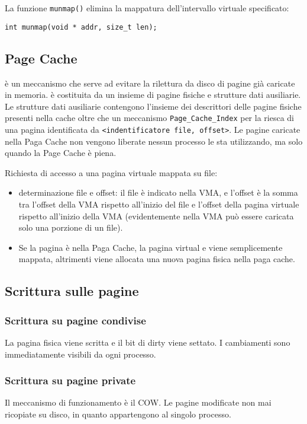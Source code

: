 \documentclass[12pt, a4paper]{report}
\begin{document}
La funzione \texttt{munmap()} elimina la mappatura dell'intervallo virtuale
specificato:
\begin{verbatim}
int munmap(void * addr, size_t len);
\end{verbatim}

\subsection{Page Cache}
è un meccanismo che serve ad evitare la rilettura da disco di pagine già
caricate in memoria. è costituita da un insieme di pagine fisiche e strutture
dati ausiliarie. Le strutture dati ausiliarie contengono l'insieme dei
descrittori delle pagine fisiche presenti nella cache oltre che un meccanismo
\texttt{Page\_Cache\_Index} per la riesca di una pagina identificata da
\texttt{<indentificatore file, offset>}. Le pagine caricate nella Paga Cache non
vengono liberate nessun processo le sta utilizzando, ma solo quando la Page
Cache è piena.

Richiesta di accesso a una pagina virtuale mappata su file:
\begin{itemize}
	\item determinazione file e offset: il file è indicato nella VMA, e
		l'offset è la somma tra l'offset della VMA rispetto all'inizio del file
		e l'offset della pagina virtuale rispetto all'inizio della VMA
		(evidentemente nella VMA può essere caricata solo una porzione di un
		file).
	\item Se la pagina è nella Paga Cache, la pagina virtual e viene
		semplicemente mappata, altrimenti viene allocata una nuova pagina fisica
		nella paga cache.
\end{itemize}

\subsection{Scrittura sulle pagine}
\subsubsection{Scrittura su pagine condivise}
La pagina fisica viene scritta e il bit di dirty viene settato. I cambiamenti
sono immediatamente visibili da ogni processo.
\subsubsection{Scrittura su pagine private}
Il meccanismo di funzionamento è il COW. Le pagine modificate non mai ricopiate
su disco, in quanto appartengono al singolo processo.
\end{document}
